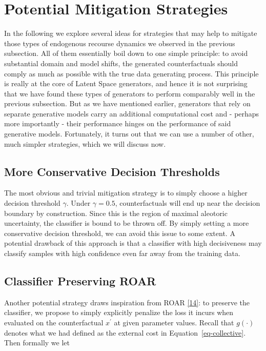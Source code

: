 \documentclass[
  conference]{IEEEtran}
\begin{document}
\hypertarget{sec-empirical-2-mitigate}{%
\section{Potential Mitigation
Strategies}\label{sec-empirical-2-mitigate}}

In the following we explore several ideas for strategies that may help
to mitigate those types of endogenous recourse dynamics we observed in
the previous subsection. All of them essentially boil down to one simple
principle: to avoid substantial domain and model shifts, the generated
counterfactuals should comply as much as possible with the true data
generating process. This principle is really at the core of Latent Space
generators, and hence it is not surprising that we have found these
types of generators to perform comparably well in the previous
subsection. But as we have mentioned earlier, generators that rely on
separate generative models carry an additional computational cost and -
perhaps more importantly - their performance hinges on the performance
of said generative models. Fortunately, it turns out that we can use a
number of other, much simpler strategies, which we will discuss now.

\hypertarget{more-conservative-decision-thresholds}{%
\subsection{More Conservative Decision
Thresholds}\label{more-conservative-decision-thresholds}}

The most obvious and trivial mitigation strategy is to simply choose a
higher decision threshold \(\gamma\). Under \(\gamma=0.5\),
counterfactuals will end up near the decision boundary by construction.
Since this is the region of maximal aleotoric uncertainty, the
classifier is bound to be thrown off. By simply setting a more
conservative decision threshold, we can avoid this issue to some extent.
A potential drawback of this approach is that a classifier with high
decisiveness may classify samples with high confidence even far away
from the training data.

\hypertarget{classifier-preserving-roar}{%
\subsection{Classifier Preserving
ROAR}\label{classifier-preserving-roar}}

Another potential strategy draws inspiration from ROAR
\protect\hyperlink{ref-upadhyay2021towards}{{[}14{]}}: to preserve the
classifier, we propose to simply explicitly penalize the loss it incurs
when evaluated on the counterfactual \(x^\prime\) at given parameter
values. Recall that \(g(\cdot)\) denotes what we had defined as the
external cost in Equation~\ref{eq-collective}. Then formally we let
\end{document}
